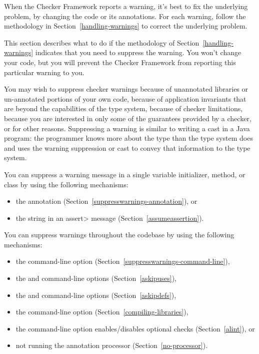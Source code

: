 \htmlhr
{}


When the Checker Framework reports a warning, it's best to fix the
underlying problem, by changing the code or its annotations.  For each
warning, follow the methodology in Section~\ref{handling-warnings} to
correct the underlying problem.

This section describes what to do if the methodology of
Section~\ref{handling-warnings} indicates that you need to suppress the
warning.  You won't change your code, but you will prevent the Checker
Framework from reporting this particular warning to you.

You may wish to suppress checker warnings because of unannotated libraries
or un-annotated portions of your own code, because of application
invariants that are beyond the capabilities of the type system, because of
checker limitations, because you are interested in only some of the
guarantees provided by a checker, or for other reasons.
Suppressing a warning is similar to writing a cast in a Java
program:  the programmer knows more about the type than the type system does
and uses the warning suppression or cast to convey that information to the
type system.

You can suppress a warning message in a single variable initializer,
method, or class by using the following mechanisms:

\begin{itemize}
\item
  the  annotation
  (Section~\ref{suppresswarnings-annotation}), or
\item
  the  string in an \<assert> message (Section~\ref{assumeassertion}).
\end{itemize}

You can suppress warnings throughout the codebase by using the following mechanisms:

\begin{itemize}
\item
  the  command-line option (Section~\ref{suppresswarnings-command-line}),
\item
  the  and  command-line options (Section~\ref{askipuses}),
\item
  the  and  command-line options (Section~\ref{askipdefs}),
\item
  the  command-line
  option (Section~\ref{compiling-libraries}),
\item
  the  command-line option enables/disables optional checks (Section~\ref{alint}), or
\item
  not running the annotation processor
  (Section~\ref{no-processor}).
\end{itemize}

